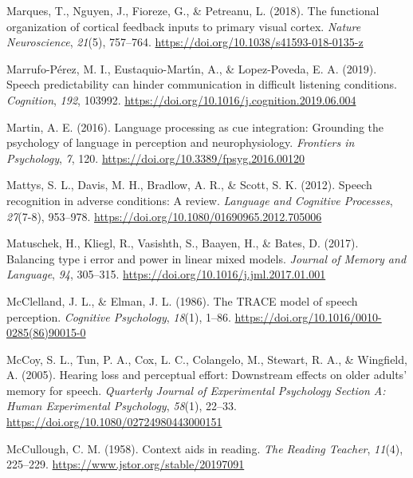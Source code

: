 \documentclass[a4paper, nobind]{templates/ociamthesis}
\newlength{\cslhangindent}
\newenvironment{CSLReferences}[2] %
 {%
  \setlength{\parindent}{0pt}
  \ifodd #1
  \let\oldpar\par
  \def\par{\hangindent=\cslhangindent\oldpar}
  \fi
  \setlength{\parskip}{1mm}
  \setlength{\baselineskip}{6mm}
 }%
 {}
\begin{document}
\begin{CSLReferences}{1}{0}
\leavevmode{}%
Marques, T., Nguyen, J., Fioreze, G., \& Petreanu, L. (2018). The functional organization of cortical feedback inputs to primary visual cortex. \emph{Nature Neuroscience}, \emph{21}(5), 757--764. \url{https://doi.org/10.1038/s41593-018-0135-z}

\leavevmode{}%
Marrufo-Pérez, M. I., Eustaquio-Martı́n, A., \& Lopez-Poveda, E. A. (2019). Speech predictability can hinder communication in difficult listening conditions. \emph{Cognition}, \emph{192}, 103992. \url{https://doi.org/10.1016/j.cognition.2019.06.004}

\leavevmode{}%
Martin, A. E. (2016). Language processing as cue integration: Grounding the psychology of language in perception and neurophysiology. \emph{Frontiers in Psychology}, \emph{7}, 120. \url{https://doi.org/10.3389/fpsyg.2016.00120}

\leavevmode{}%
Mattys, S. L., Davis, M. H., Bradlow, A. R., \& Scott, S. K. (2012). {Speech recognition in adverse conditions: A review}. \emph{Language and Cognitive Processes}, \emph{27}(7-8), 953--978. \url{https://doi.org/10.1080/01690965.2012.705006}

\leavevmode{}%
Matuschek, H., Kliegl, R., Vasishth, S., Baayen, H., \& Bates, D. (2017). Balancing type i error and power in linear mixed models. \emph{Journal of Memory and Language}, \emph{94}, 305--315. \url{https://doi.org/10.1016/j.jml.2017.01.001}

\leavevmode{}%
McClelland, J. L., \& Elman, J. L. (1986). {The TRACE model of speech perception}. \emph{Cognitive Psychology}, \emph{18}(1), 1--86. \url{https://doi.org/10.1016/0010-0285(86)90015-0}

\leavevmode{}%
McCoy, S. L., Tun, P. A., Cox, L. C., Colangelo, M., Stewart, R. A., \& Wingfield, A. (2005). {Hearing loss and perceptual effort: Downstream effects on older adults' memory for speech}. \emph{Quarterly Journal of Experimental Psychology Section A: Human Experimental Psychology}, \emph{58}(1), 22--33. \url{https://doi.org/10.1080/02724980443000151}

\leavevmode{}%
McCullough, C. M. (1958). {Context aids in reading}. \emph{The Reading Teacher}, \emph{11}(4), 225--229. \url{https://www.jstor.org/stable/20197091}


\end{CSLReferences}
\end{document}
